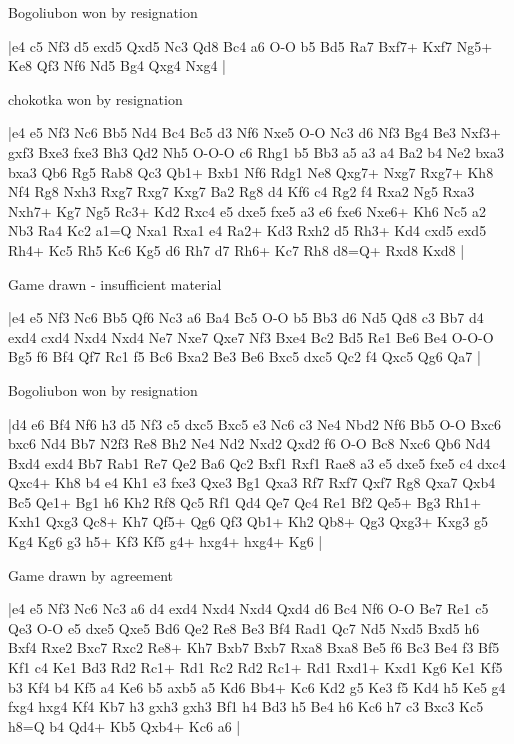 Bogoliubon won by resignation

\makegametitle
|e4 c5 Nf3 d5 exd5 Qxd5 Nc3 Qd8 Bc4 a6 O-O b5 Bd5 Ra7 Bxf7+ Kxf7 Ng5+ Ke8 Qf3 Nf6 Nd5 Bg4 Qxg4 Nxg4  |

\showboard

chokotka won by resignation

\makegametitle
|e4 e5 Nf3 Nc6 Bb5 Nd4 Bc4 Bc5 d3 Nf6 Nxe5 O-O Nc3 d6 Nf3 Bg4 Be3 Nxf3+ gxf3 Bxe3 fxe3 Bh3 Qd2 Nh5 O-O-O c6 Rhg1 b5 Bb3 a5 a3 a4 Ba2 b4 Ne2 bxa3 bxa3 Qb6 Rg5 Rab8 Qc3 Qb1+ Bxb1 Nf6 Rdg1 Ne8 Qxg7+ Nxg7 Rxg7+ Kh8 Nf4 Rg8 Nxh3 Rxg7 Rxg7 Kxg7 Ba2 Rg8 d4 Kf6 c4 Rg2 f4 Rxa2 Ng5 Rxa3 Nxh7+ Kg7 Ng5 Rc3+ Kd2 Rxc4 e5 dxe5 fxe5 a3 e6 fxe6 Nxe6+ Kh6 Nc5 a2 Nb3 Ra4 Kc2 a1=Q Nxa1 Rxa1 e4 Ra2+ Kd3 Rxh2 d5 Rh3+ Kd4 cxd5 exd5 Rh4+ Kc5 Rh5 Kc6 Kg5 d6 Rh7 d7 Rh6+ Kc7 Rh8 d8=Q+ Rxd8 Kxd8  |

\showboard

Game drawn - insufficient material

\makegametitle
|e4 e5 Nf3 Nc6 Bb5 Qf6 Nc3 a6 Ba4 Bc5 O-O b5 Bb3 d6 Nd5 Qd8 c3 Bb7 d4 exd4 cxd4 Nxd4 Nxd4 Ne7 Nxe7 Qxe7 Nf3 Bxe4 Bc2 Bd5 Re1 Be6 Be4 O-O-O Bg5 f6 Bf4 Qf7 Rc1 f5 Bc6 Bxa2 Be3 Be6 Bxc5 dxc5 Qc2 f4 Qxc5 Qg6 Qa7  |

\showboard

Bogoliubon won by resignation

\makegametitle
|d4 e6 Bf4 Nf6 h3 d5 Nf3 c5 dxc5 Bxc5 e3 Nc6 c3 Ne4 Nbd2 Nf6 Bb5 O-O Bxc6 bxc6 Nd4 Bb7 N2f3 Re8 Bh2 Ne4 Nd2 Nxd2 Qxd2 f6 O-O Bc8 Nxc6 Qb6 Nd4 Bxd4 exd4 Bb7 Rab1 Re7 Qe2 Ba6 Qc2 Bxf1 Rxf1 Rae8 a3 e5 dxe5 fxe5 c4 dxc4 Qxc4+ Kh8 b4 e4 Kh1 e3 fxe3 Qxe3 Bg1 Qxa3 Rf7 Rxf7 Qxf7 Rg8 Qxa7 Qxb4 Bc5 Qe1+ Bg1 h6 Kh2 Rf8 Qc5 Rf1 Qd4 Qe7 Qc4 Re1 Bf2 Qe5+ Bg3 Rh1+ Kxh1 Qxg3 Qc8+ Kh7 Qf5+ Qg6 Qf3 Qb1+ Kh2 Qb8+ Qg3 Qxg3+ Kxg3 g5 Kg4 Kg6 g3 h5+ Kf3 Kf5 g4+ hxg4+ hxg4+ Kg6  |

\showboard

Game drawn by agreement

\makegametitle
|e4 e5 Nf3 Nc6 Nc3 a6 d4 exd4 Nxd4 Nxd4 Qxd4 d6 Bc4 Nf6 O-O Be7 Re1 c5 Qe3 O-O e5 dxe5 Qxe5 Bd6 Qe2 Re8 Be3 Bf4 Rad1 Qc7 Nd5 Nxd5 Bxd5 h6 Bxf4 Rxe2 Bxc7 Rxc2 Re8+ Kh7 Bxb7 Bxb7 Rxa8 Bxa8 Be5 f6 Bc3 Be4 f3 Bf5 Kf1 c4 Ke1 Bd3 Rd2 Rc1+ Rd1 Rc2 Rd2 Rc1+ Rd1 Rxd1+ Kxd1 Kg6 Ke1 Kf5 b3 Kf4 b4 Kf5 a4 Ke6 b5 axb5 a5 Kd6 Bb4+ Kc6 Kd2 g5 Ke3 f5 Kd4 h5 Ke5 g4 fxg4 hxg4 Kf4 Kb7 h3 gxh3 gxh3 Bf1 h4 Bd3 h5 Be4 h6 Kc6 h7 c3 Bxc3 Kc5 h8=Q b4 Qd4+ Kb5 Qxb4+ Kc6 a6  |

